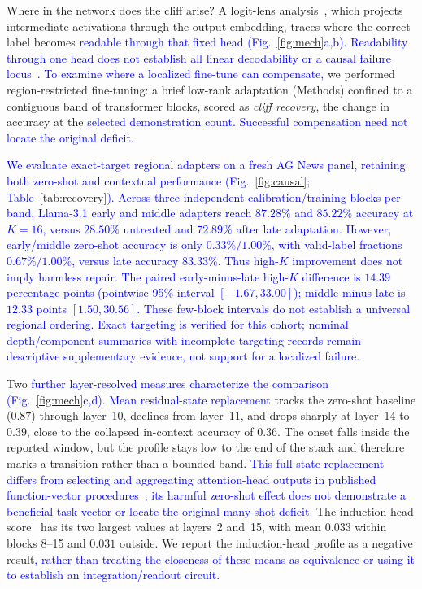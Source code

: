 \documentclass[pdflatex, sn-nature]{sn-jnl}%
\theoremstyle{thmstyleone}%
\theoremstyle{thmstyletwo}%
\theoremstyle{thmstylethree}%
\begin{document}
Where in the network does the cliff arise? A logit-lens
analysis~\cite{nostalgebraist2020logit}, which projects intermediate activations through
the output embedding, traces where the correct label becomes \textcolor{blue}{readable through that
fixed head (Fig.}~\textcolor{blue}{\ref{fig:mech}}\textcolor{blue}{a,b). Readability through one head does not establish all
linear decodability or a causal failure locus}~\textcolor{blue}{\cite{belrose2023tunedlens}}\textcolor{blue}{. To examine
where a localized fine-tune can compensate,} we performed region-restricted fine-tuning:
a brief low-rank adaptation (Methods) confined to a contiguous band of transformer
blocks, scored as \emph{cliff recovery}, the change in accuracy at the \textcolor{blue}{selected
demonstration count. Successful compensation need not locate the original deficit.}

\textcolor{blue}{We evaluate exact-target regional adapters on a fresh AG News panel, retaining both zero-shot and contextual performance (Fig.~\ref{fig:causal}; Table~\ref{tab:recovery}). Across three independent calibration/training blocks per band, Llama-3.1 early and middle adapters reach $87.28\%$ and $85.22\%$ accuracy at $K{=}16$, versus $28.50\%$ untreated and $72.89\%$ after late adaptation. However, early/middle zero-shot accuracy is only $0.33\%/1.00\%$, with valid-label fractions $0.67\%/1.00\%$, versus late accuracy $83.33\%$. Thus high-$K$ improvement does not imply harmless repair. The paired early-minus-late high-$K$ difference is $14.39$ percentage points (pointwise 95\% interval $[-1.67,33.00]$); middle-minus-late is $12.33$ points $[1.50,30.56]$. These few-block intervals do not establish a universal regional ordering. Exact targeting is verified for this cohort; nominal depth/component summaries with incomplete targeting records remain descriptive supplementary evidence, not support for a localized failure.}


Two \textcolor{blue}{further layer-resolved measures characterize the comparison
(Fig.}~\textcolor{blue}{\ref{fig:mech}}\textcolor{blue}{c,d). Mean residual-state replacement} tracks the zero-shot baseline
($0.87$) through layer~10, declines from layer~11, and drops sharply at layer~14 to
$0.39$, close to the collapsed in-context accuracy of $0.36$. The onset falls inside the reported window, but the profile stays low to the end of
the stack and therefore marks a transition rather than a bounded band.
\textcolor{blue}{This full-state replacement differs from selecting and aggregating attention-head outputs
in published function-vector procedures}~\textcolor{blue}{\cite{hendel2023taskvectors,todd2024functionvectors}}\textcolor{blue}{;
its harmful zero-shot effect does not demonstrate a beneficial task vector or locate the
original many-shot deficit.} The induction-head score~\cite{olsson2022induction} has its
two largest values at layers~2 and~15, with mean $0.033$ within blocks 8--15 and $0.031$
outside. We report the induction-head profile as a negative result\textcolor{blue}{, rather than treating
the closeness of these means as equivalence or using it to establish an
integration/readout circuit.}
\end{document}
